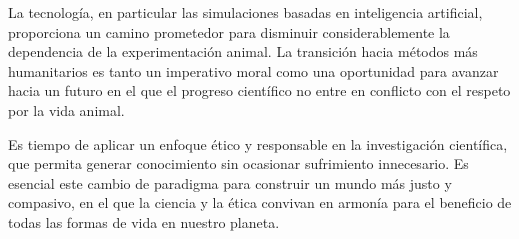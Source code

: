 \documentclass[letterpaper, 12pt]{report}
\begin{document}
La tecnología, en particular las simulaciones basadas en inteligencia
artificial, proporciona un camino prometedor para disminuir
considerablemente la dependencia de la experimentación animal. La transición
hacia métodos más humanitarios es tanto un imperativo moral como una
oportunidad para avanzar hacia un futuro en el que el progreso científico
no entre en conflicto con el respeto por la vida animal.

Es tiempo de aplicar un enfoque ético y responsable en la investigación
científica, que permita generar conocimiento sin ocasionar sufrimiento
innecesario. Es esencial este cambio de paradigma para construir un mundo
más justo y compasivo, en el que la ciencia y la ética convivan en armonía
para el beneficio de todas las formas de vida en nuestro planeta.

\printbibliography
\end{document}
